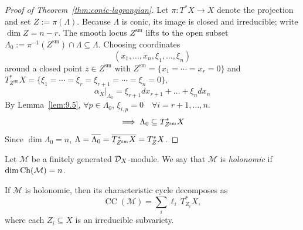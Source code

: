 \begin{proof}[Proof of Theorem~\ref{thm:conic-lagrangian}]
    Let $\pi\colon T^\ast X\to X$ denote the projection and set $Z:=\pi(\Lambda)$.
    Because $\Lambda$ is conic, its image is closed and irreducible; write
    $\dim Z=n-r$.  The smooth locus $Z^{\mathrm{sm}}$ lifts to the open subset
    $\Lambda_0:=\pi^{-1}(Z^{\mathrm{sm}})\cap \Lambda\subseteq \Lambda$.  Choosing
    coordinates
    \[
        (x_1,\dots,x_n,\xi_1,\dots,\xi_n)
    \]
    around a closed point $z\in Z^{\mathrm{sm}}$ with
    $Z^{\mathrm{sm}}=\{x_1=\cdots=x_r=0\}$ and
    $T^\ast_{Z^{\mathrm{sm}}} X=\{\xi_1=\cdots=\xi_r=\xi_{r+1}=\cdots=\xi_n=0\}$,
    \[
        \alpha_X|_{\Lambda_0} = \xi_{r+1} dx_{r+1} + \dots + \xi_n dx_n
    \]
    By Lemma~\ref{lem:9.5}, $\forall p \in \Lambda_0$, $\xi_{i,p} = 0 \quad \forall i = r+1, \dots, n$.
    \[
        \implies \Lambda_0 \subseteq T^*_{Z^{\mathrm{sm}}} X
    \]
    Since $\dim \Lambda_0 = n$, $\Lambda = \overline{\Lambda_0} = \overline{T^*_{Z^{\mathrm{sm}}} X} = T^*_Z X$.
\end{proof}

\begin{definition}[Def.~9.7]
    Let $\mathcal M$ be a finitely generated $\mathcal{D}_X$-module.  We say that
    $\mathcal M$ is \emph{holonomic} if $\dim \operatorname{Ch}(\mathcal M)=n$.
\end{definition}

\begin{corollary}
    If $\mathcal M$ is holonomic, then its characteristic cycle decomposes as
    \[
        \operatorname{CC}(\mathcal M)
        = \sum_i \ell_i\, T^\ast_{Z_i} X,
    \]
    where each $Z_i\subseteq X$ is an irreducible subvariety.
\end{corollary}
